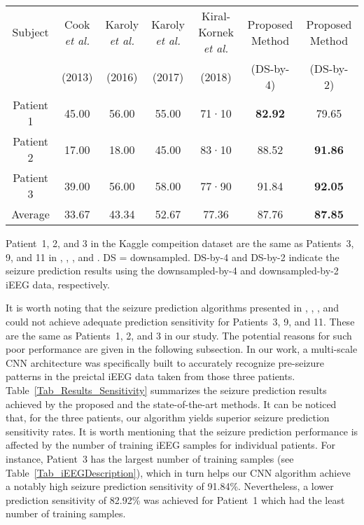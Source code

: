 \documentclass[journal]{IEEEtran}
\begin{document}
\begin{table*}[!t]\small
	\centering
	\caption{Seizure prediction sensitivity scores of the algorithms under study.}
\label{Tab_Results_Sensitivity}
\begin{tabular}{c c c c c c c}
		\hline
		\hline
		Subject & Cook \textit{et al.} \cite{cook2013prediction} & Karoly \textit{et al.} \cite{karoly2016interictal} & Karoly \textit{et al.} \cite{karoly2017circadian} & Kiral-Kornek \textit{et al.} \cite{kiral2018epileptic} &  Proposed Method &  Proposed Method\\
		
		& (2013) & (2016) & (2017) & (2018) &  (DS-by-4) &  (DS-by-2) \\
		\hline
		Patient 1 & 45.00 & 56.00 & 55.00 & 71·10 & \textbf{82.92} & 79.65 \\
		Patient 2 & 17.00 & 18.00 & 45.00 & 83·10 & 88.52 & \textbf{91.86} \\
		Patient 3 & 39.00 & 56.00 & 58.00 & 77·90 & 91.84 & \textbf{92.05} \\
		\hline
		Average & 33.67 & 43.34 & 52.67 & 77.36 & 87.76 & \textbf{87.85} \\
		\hline
		\hline
	\end{tabular} 
\raggedright
	\justify 
	Patient~1, 2, and 3 in the Kaggle compeition dataset are the same as Patients~3, 9, and 11 in \cite{cook2013prediction}, \cite{karoly2016interictal}, \cite{karoly2017circadian}, and \cite{kiral2018epileptic}. DS = downsampled. DS-by-4 and DS-by-2 indicate the seizure prediction results using the downsampled-by-4 and downsampled-by-2 iEEG data, respectively.
\end{table*}

It is worth noting that the seizure prediction algorithms presented in \cite{cook2013prediction}, \cite{karoly2016interictal}, \cite{karoly2017circadian}, and \cite{kiral2018epileptic} could not achieve adequate prediction sensitivity for Patients~3, 9, and 11. These are the same as Patients~1, 2, and 3 in our study. The potential reasons for such poor performance are given in the following subsection. In our work, a multi-scale CNN architecture was specifically built to accurately recognize pre-seizure patterns in the preictal iEEG data taken from those three patients. Table~\ref{Tab_Results_Sensitivity} summarizes the seizure prediction results achieved by the proposed and the state-of-the-art methods. It can be noticed that, for the three patients, our algorithm yields superior seizure prediction sensitivity rates. It is worth mentioning that the seizure prediction performance is affected by the number of training iEEG samples for individual patients. For instance, Patient~3 has the largest number of training samples (see Table~\ref{Tab_iEEGDescription}), which in turn helps our CNN algorithm achieve a notably high seizure prediction sensitivity of 91.84\%. Nevertheless, a lower prediction sensitivity of 82.92\% was achieved for Patient~1 which had the least number of training samples.
\end{document}
